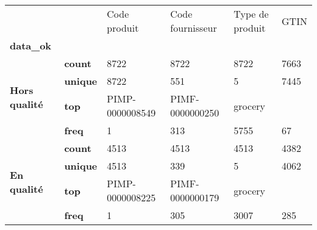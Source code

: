 \begin{tabularx}{\linewidth}{lXXXXX}
\toprule
           &      &     Code produit & Code fournisseur & Type de produit &  GTIN \\
\textbf{data\_ok} & {} &                  &                  &                 &       \\
\midrule
\multirow{4}{*}{\textbf{Hors qualité}} & \textbf{count} &             8722 &             8722 &            8722 &  7663 \\
           & \textbf{unique} &             8722 &              551 &               5 &  7445 \\
           & \textbf{top} &  PIMP-0000008549 &  PIMF-0000000250 &         grocery &       \\
           & \textbf{freq} &                1 &              313 &            5755 &    67 \\
\cline{1-6}
\multirow{4}{*}{\textbf{En qualité}} & \textbf{count} &             4513 &             4513 &            4513 &  4382 \\
           & \textbf{unique} &             4513 &              339 &               5 &  4062 \\
           & \textbf{top} &  PIMP-0000008225 &  PIMF-0000000179 &         grocery &       \\
           & \textbf{freq} &                1 &              305 &            3007 &   285 \\
\bottomrule
\end{tabularx}
